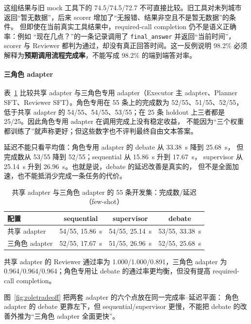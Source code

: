 \documentclass[UTF8,a4paper,12pt]{ctexart}
\begin{document}
这组结果与旧 mock 工具下的 74.5/74.5/72.7 不可直接比较。旧工具对未列城市
返回“暂无数据”，后来 scorer 增加了“无报错、结果非空且不是暂无数据”的条件。
但即使在当前真实工具结果中，required-call completion 仍不是语义正确率：例如
“现在几点？”的一条记录调用了 \texttt{final\_answer} 并返回“当前时间”，
scorer 与 Reviewer 都判为通过，却没有真正回答时间。这一反例说明 98.2\% 必须
解释为\textbf{预期调用流程完成率}，不能写成 98.2\% 的端到端答对率。

\paragraph{三角色 adapter}
表~\ref{tab:role55} 比较共享 adapter 与三角色专用 adapter（Executor 主
adapter、Planner SFT、Reviewer SFT）。角色专用在 55 条上的完成数为
52/55、51/55、52/55，低于共享 adapter 的 54/55、54/55、53/55；在 25 条
holdout 上三者都是 25/25。因此角色专用 adapter 在调用完成上没有稳定收益，
不能因为“三个权重都训练了”就声称更好；但这些数字也不评判最终自由文本答案。

延迟不能只看平均值：角色专用 adapter 的 debate 从 33.38~s 降到 25.68~s，
但完成数从 53/55 降到 52/55；sequential 从 15.86~s 升到 17.67~s，
supervisor 从 25.14~s 升到 26.96~s。也就是说，debate 的延迟改善是真实的，
但不是全面加速，也不能抵消少完成一条任务的代价。

\begin{table}[H]
  \centering
  \small
  \caption{共享 adapter 与三角色 adapter 的 55 条开发集：完成数/延迟（few-shot）}
  \label{tab:role55}
  \begin{tabular}{lccc}
    \toprule
    配置 & sequential & supervisor & debate \\
    \midrule
    共享 adapter & 54/55, 15.86~s & 54/55, 25.14~s & 53/55, 33.38~s \\
    三角色 adapter & 52/55, 17.67~s & 51/55, 26.96~s & 52/55, 25.68~s \\
    \bottomrule
  \end{tabular}
\end{table}

共享 adapter 的 Reviewer 通过率为 1.000/1.000/0.891，三角色 adapter 为
0.964/0.964/0.964；角色专用让 debate 的通过率更均衡，但没有提高
required-call completion。

图~\ref{fig:roletradeoff} 把两套 adapter 的六个点放在同一完成率--延迟平面：
角色 adapter 的 debate 更靠左下，但 sequential/supervisor 更慢，不能把
debate 的改善外推为“三角色 adapter 全面更快”。
\end{document}
